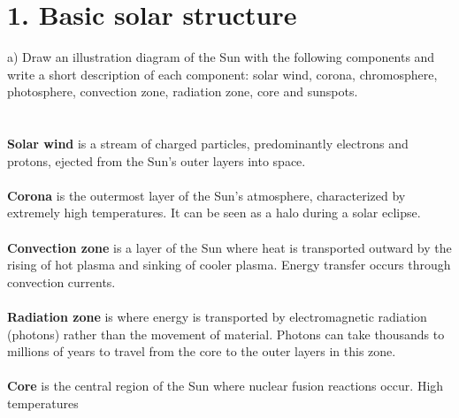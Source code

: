\section*{1. Basic solar structure}

a) Draw an illustration diagram of the Sun with the following components and write a short description of
each component: solar wind, corona, chromosphere, photosphere, convection zone, radiation zone, core and
sunspots.\\
\\
\noindent{}\\
\noindent
\textbf{Solar wind} is a stream of charged particles, predominantly electrons and protons, ejected from 
the Sun's outer layers into space.\\
\\
\textbf{Corona} is the outermost layer of the Sun's atmosphere, characterized by extremely high 
temperatures. It can be seen as a halo during a solar eclipse.\\
\\
\textbf{Convection zone} is a layer of the Sun where heat is transported outward by the rising of hot 
plasma and sinking of cooler plasma. Energy transfer occurs through convection currents.\\
\\
\textbf{Radiation zone} is where energy is transported by electromagnetic radiation (photons) rather than 
the movement of material. Photons can take thousands to millions of years to travel from the core to the 
outer layers in this zone.\\
\\
\textbf{Core} is the central region of the Sun where nuclear fusion reactions occur. High temperatures 
